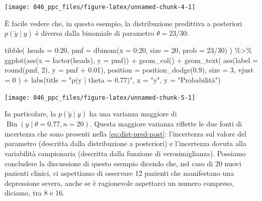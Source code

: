 \documentclass[
  10pt,
  italian,
  a4paper,
  extrafontsizes,onecolumn,openright
  ]{memoir}
\newenvironment{Shaded}{\begin{snugshade}}{\end{snugshade}}
\newcommand{\AttributeTok}[1]{\textcolor[rgb]{0.77,0.63,0.00}{#1}}
\newcommand{\DecValTok}[1]{\textcolor[rgb]{0.00,0.00,0.81}{#1}}
\newcommand{\FloatTok}[1]{\textcolor[rgb]{0.00,0.00,0.81}{#1}}
\newcommand{\FunctionTok}[1]{\textcolor[rgb]{0.00,0.00,0.00}{#1}}
\newcommand{\NormalTok}[1]{#1}
\newcommand{\SpecialCharTok}[1]{\textcolor[rgb]{0.00,0.00,0.00}{#1}}
\newcommand{\StringTok}[1]{\textcolor[rgb]{0.31,0.60,0.02}{#1}}
\DeclareMathOperator{\Bin}{Bin} %
\begin{document}
\begin{center}\texttt{[image: 046\_ppc\_files/figure-latex/unnamed-chunk-4-1]} \end{center}

\noindent
È facile vedere che, in questo esempio, la distribuzione predittiva a posteriori \(p(\tilde{y} \mid y)\) è diversa dalla binomiale di parametro \(\theta = 23/30\):

\begin{Shaded}
\begin{Highlighting}[]
\FunctionTok{tibble}\NormalTok{(}
  \AttributeTok{heads =} \DecValTok{0}\SpecialCharTok{:}\DecValTok{20}\NormalTok{,}
  \AttributeTok{pmf =} \FunctionTok{dbinom}\NormalTok{(}\AttributeTok{x =} \DecValTok{0}\SpecialCharTok{:}\DecValTok{20}\NormalTok{, }\AttributeTok{size =} \DecValTok{20}\NormalTok{, }\AttributeTok{prob =} \DecValTok{23}\SpecialCharTok{/}\DecValTok{30}\NormalTok{)}
\NormalTok{) }\SpecialCharTok{\%\textgreater{}\%}
\FunctionTok{ggplot}\NormalTok{(}\FunctionTok{aes}\NormalTok{(}\AttributeTok{x =} \FunctionTok{factor}\NormalTok{(heads), }\AttributeTok{y =}\NormalTok{ pmf)) }\SpecialCharTok{+}
  \FunctionTok{geom\_col}\NormalTok{() }\SpecialCharTok{+}
  \FunctionTok{geom\_text}\NormalTok{(}
    \FunctionTok{aes}\NormalTok{(}\AttributeTok{label =} \FunctionTok{round}\NormalTok{(pmf, }\DecValTok{2}\NormalTok{), }\AttributeTok{y =}\NormalTok{ pmf }\SpecialCharTok{+} \FloatTok{0.01}\NormalTok{),}
    \AttributeTok{position =} \FunctionTok{position\_dodge}\NormalTok{(}\FloatTok{0.9}\NormalTok{),}
    \AttributeTok{size =} \DecValTok{3}\NormalTok{,}
    \AttributeTok{vjust =} \DecValTok{0}
\NormalTok{  ) }\SpecialCharTok{+}
  \FunctionTok{labs}\NormalTok{(}\AttributeTok{title =} \StringTok{"p(y | theta = 0.77)"}\NormalTok{,}
       \AttributeTok{x =} \StringTok{"y"}\NormalTok{,}
       \AttributeTok{y =} \StringTok{"Probabilità"}\NormalTok{)}
\end{Highlighting}
\end{Shaded}

\begin{center}\texttt{[image: 046\_ppc\_files/figure-latex/unnamed-chunk-5-1]} \end{center}

\noindent
In particolare, la \(p(\tilde{y} \mid y)\) ha una varianza maggiore di \(\Bin(y \mid \theta = 0.77, n = 20)\). Questa maggiore varianza riflette le due fonti di incertezza che sono presenti nella \eqref{eq:dist-pred-post}: l'incertezza sul valore del parametro (descritta dalla distribuzione a posteriori) e l'incertezza dovuta alla variabilità campionaria (descritta dalla funzione di verosimiglianza).
Possiamo concludere la discussione di questo esempio dicendo che, nel caso di 20 nuovi pazienti clinici, ci aspettiamo di osservare 12 pazienti che manifestano una depressione severa, anche se è ragionevole aspettarci un numero compreso, diciamo, tra 8 e 16.
\end{document}
